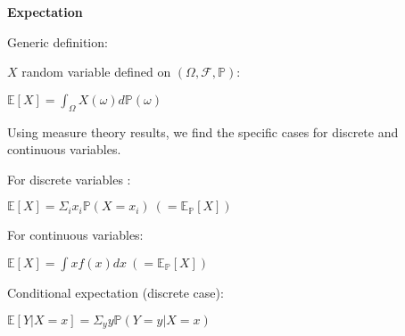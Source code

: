 {\fontsize{12pt}{22pt} \textbf{Expectation}\par}

\vspace{5mm}

Generic definition:

$X$ random variable defined on $(\Omega, \mathcal{F} ,\mathbb{P})$:

$\mathbb{E}[X] = \int_{\Omega} X(\omega) d\mathbb{P}(\omega)$

\vspace{5mm}

Using measure theory results, we find the specific cases for discrete and continuous variables.

\vspace{5mm}

For discrete variables :

$\mathbb{E}[X] = \Sigma_i x_i \mathbb{P}(X=x_i)~(= \mathbb{E}_{\mathbb{P}}[X])$

\vspace{5mm}

For continuous variables:

$\mathbb{E}[X] = \int x f(x) dx~(= \mathbb{E}_{\mathbb{P}}[X])$

\vspace{5mm}

Conditional expectation (discrete case):

$\mathbb{E}[Y|X=x] = \Sigma_y y \mathbb{P}(Y=y | X=x)$

\vspace{5mm}